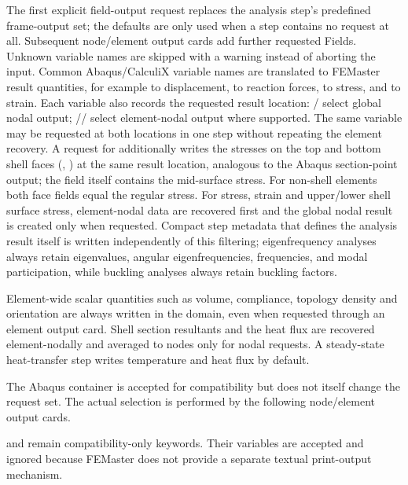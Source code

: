 The first explicit field-output request replaces the analysis step's predefined frame-output set; the defaults are only used when a step contains no request at all. Subsequent node/element output cards add further requested Fields. Unknown variable names are skipped with a warning instead of aborting the input. Common Abaqus/CalculiX variable names are translated to FEMaster result quantities, for example  to displacement,  to reaction forces,  to stress, and  to strain. Each variable also records the requested result location: / select global nodal output; // select element-nodal output where supported. The same variable may be requested at both locations in one step without repeating the element recovery. A request for  additionally writes the stresses on the top and bottom shell faces (, ) at the same result location, analogous to the Abaqus section-point output; the  field itself contains the mid-surface stress. For non-shell elements both face fields equal the regular stress. For stress, strain and upper/lower shell surface stress, element-nodal data are recovered first and the global nodal result is created only when requested. Compact step metadata that defines the analysis result itself is written independently of this filtering; eigenfrequency analyses always retain eigenvalues, angular eigenfrequencies, frequencies, and modal participation, while buckling analyses always retain buckling factors.

Element-wide scalar quantities such as volume, compliance, topology density and orientation are always written in the  domain, even when requested through an element output card. Shell section resultants and the heat flux  are recovered element-nodally and averaged to nodes only for nodal requests. A steady-state heat-transfer step writes temperature  and heat flux  by default.

The Abaqus container  is accepted for compatibility but does not itself change the request set. The actual selection is performed by the following node/element output cards.

 and  remain compatibility-only keywords. Their variables are accepted and ignored because FEMaster does not provide a separate textual print-output mechanism.


